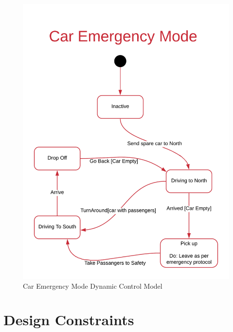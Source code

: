 \documentclass[12pt]{article}
\begin{document}
    \begin{figure}[H]
 		\centerline{\includegraphics[scale=0.15]{CarEmergencyMode.png}}
 		\caption{Car Emergency Mode Dynamic Control Model}
  		\label{fig:normal}
    \end{figure}
%
%	

\section{Design Constraints} \label{cons} %
\end{document}
